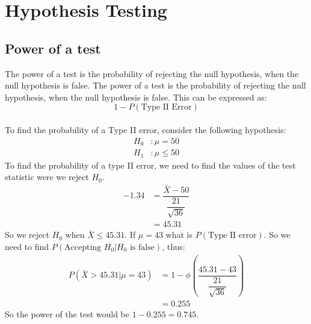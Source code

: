     \section{Hypothesis Testing}
        \subsection{Power of a test}
            The power of a test is the probability of rejecting the null hypothesis, when the null hypothesis is false. The power of a test is the probability of rejecting the null hypothesis, when the null hypothesis is false. This can be expressed as:
            \\
            $$1 - P(\text{Type II Error})$$
            \\
            To find the probability of a Type II error, consider the following hypothesis:
            \begin{align*}
            H_0&: \mu = 50   \\
            H_1&: \mu \leq 50
            \end{align*}
            To find the probability of a type II error, we need to find the values of the test statistic were we reject $H_0$.\\
            \begin{align*}
                -1.34 &= \dfrac{\bar{X}-50}{\dfrac{21}{\sqrt{36}}} \\
                        &= 45.31
            \end{align*}
            So we reject $H_0$ when $\bar{X} \leq 45.31$. If $\mu = 43$ what is $P(\text{Type II error})$. So we need to find $P(\text{Accepting } H_0 | H_0 \text{ is false})$, thus:
            \begin{align*}
            P(\bar{X} > 45.31 | \mu = 43) &= 1 - \phi\left(\dfrac{45.31 - 43}{\dfrac{21}{\sqrt{36}}}\right) \\
                                          &= 0.255
            \end{align*}
            So the power of the test would be $1 - 0.255 = 0.745$.



            

